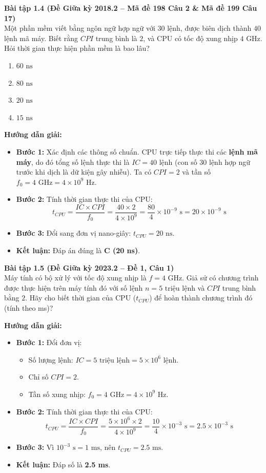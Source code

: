 \textbf{Bài tập 1.4 (Đề Giữa kỳ 2018.2 -- Mã đề 198 Câu 2 \& Mã đề 199 Câu 17)}\\
Một phần mềm viết bằng ngôn ngữ hợp ngữ với $30$ lệnh, được biên dịch thành $40$ lệnh mã máy. Biết rằng $CPI$ trung bình là $2$, và CPU có tốc độ xung nhịp $4\text{ GHz}$. Hỏi thời gian thực hiện phần mềm là bao lâu?
\begin{enumerate}[label=\Alph*.]
    \item $60\text{ ns}$
    \item $80\text{ ns}$
    \item $20\text{ ns}$
    \item $15\text{ ns}$
\end{enumerate}
\textbf{Hướng dẫn giải:}
\begin{itemize}
    \item \textbf{Bước 1:} Xác định các thông số chuẩn. CPU trực tiếp thực thi các \textbf{lệnh mã máy}, do đó tổng số lệnh thực thi là $IC = 40\text{ lệnh}$ (con số $30$ lệnh hợp ngữ trước khi dịch là dữ kiện gây nhiễu). Ta có $CPI = 2$ và tần số $f_0 = 4\text{ GHz} = 4 \times 10^9\text{ Hz}$.
    \item \textbf{Bước 2:} Tính thời gian thực thi của CPU:
    $$t_{CPU} = \frac{IC \times CPI}{f_0} = \frac{40 \times 2}{4 \times 10^9} = \frac{80}{4} \times 10^{-9}\text{ s} = 20 \times 10^{-9}\text{ s}$$
    \item \textbf{Bước 3:} Đổi sang đơn vị nano-giây: $t_{CPU} = 20\text{ ns}$.
    \item \textbf{Kết luận:} Đáp án đúng là \textbf{C (20 ns)}.
\end{itemize}

\textbf{Bài tập 1.5 (Đề Giữa kỳ 2023.2 -- Đề 1, Câu 1)}\\
Máy tính có bộ xử lý với tốc độ xung nhịp là $f = 4\text{ GHz}$. Giả sử có chương trình được thực hiện trên máy tính đó với số lệnh $n = 5\text{ triệu lệnh}$ và $CPI$ trung bình bằng $2$. Hãy cho biết thời gian của CPU ($t_{CPU}$) để hoàn thành chương trình đó (tính theo ms)?

\textbf{Hướng dẫn giải:}
\begin{itemize}
    \item \textbf{Bước 1:} Đổi đơn vị:
    \begin{itemize}
        \item Số lượng lệnh: $IC = 5\text{ triệu lệnh} = 5 \times 10^6\text{ lệnh}$.
        \item Chỉ số $CPI = 2$.
        \item Tần số xung nhịp: $f_0 = 4\text{ GHz} = 4 \times 10^9\text{ Hz}$.
    \end{itemize}
    \item \textbf{Bước 2:} Tính thời gian thực thi của CPU:
    $$t_{CPU} = \frac{IC \times CPI}{f_0} = \frac{5 \times 10^6 \times 2}{4 \times 10^9} = \frac{10}{4} \times 10^{-3}\text{ s} = 2.5 \times 10^{-3}\text{ s}$$
    \item \textbf{Bước 3:} Vì $10^{-3}\text{ s} = 1\text{ ms}$, nên $t_{CPU} = 2.5\text{ ms}$.
    \item \textbf{Kết luận:} Đáp số là \textbf{2.5 ms}.
\end{itemize}

